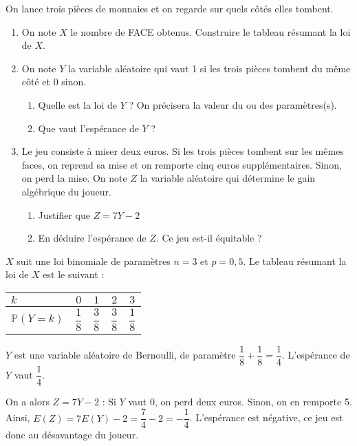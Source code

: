 \documentclass[11pt,fleqn, openany]{book} %
\begin{document}
\begin{exercise}[topic=lgn02]

On lance trois pièces de monnaies et on regarde sur quels côtés elles tombent. 
\begin{enumerate}

\item On note $X$ le nombre de FACE obtenus. Construire le tableau résumant la loi de $X$.

\item On note $Y$ la variable aléatoire qui vaut 1 si les trois pièces tombent du même côté et 0 sinon. 
\begin{enumerate}
\item Quelle est la loi de $Y$ ? On précisera la valeur du ou des paramètres(s).
\item Que vaut l'espérance de $Y$ ?
\end{enumerate}
\item Le jeu consiste à miser deux euros. Si les trois pièces tombent sur les mêmes faces, on reprend sa mise et on remporte cinq euros supplémentaires. Sinon, on perd la mise. On note $Z$ la variable aléatoire qui détermine le gain algébrique du joueur.
\begin{enumerate}
\item Justifier que $Z=7Y-2$
\item En déduire l'espérance de $Z$. Ce jeu est-il équitable ?
\end{enumerate}
\end{enumerate}

\end{exercise}

\begin{solution}

$X$ suit une loi binomiale de paramètres $n=3$ et $p=0,5$. Le tableau résumant la loi de $X$ est le suivant :
\begin{center}
\begin{tabular}{|l|c|c|c|c|}
\hline
$k$ & $0$ & $1$ & $2$ & $3$ \\
\hline
$\mathbb{P}(Y=k)$ & $\dfrac{1}{8}$ & $\dfrac{3}{8}$ & $\dfrac{3}{8}$ & $\dfrac{1}{8}$ \\
\hline \end{tabular}\end{center}

$Y$ est une variable aléatoire de Bernoulli, de paramètre $\dfrac{1}{8}+\dfrac{1}{8}=\dfrac{1}{4}$. L'espérance de $Y$ vaut $\dfrac{1}{4}$.

On a alors $Z= 7Y-2$ : Si $Y$ vaut 0, on perd deux euros. Sinon, on en remporte 5. \\Ainsi, $E(Z)=7E(Y)-2=\dfrac{7}{4}-2=-\dfrac{1}{4}$. L'espérance est négative, ce jeu est donc au désavantage du joueur.
\end{solution}
\end{document}
